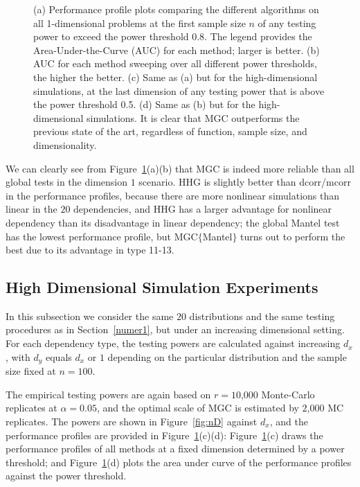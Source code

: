 \documentclass[11pt]{article}
\begin{document}
\begin{figure}[htbp]
{(a) Performance profile plots comparing the different algorithms on all 1-dimensional problems at the first sample size $n$ of any testing power to exceed the power threshold 0.8. The legend provides the Area-Under-the-Curve (AUC) for each method; larger is better.
(b) AUC for each method sweeping over all different power thresholds, the higher the better.
(c) Same as (a) but for the high-dimensional simulations, at the last dimension of any testing power that is above the power threshold 0.5.
(d) Same as (b) but for the high-dimensional simulations.
It is clear that MGC outperforms the previous state of the art, regardless of function, sample size, and dimensionality.}
\label{fig:pp}
\end{figure}

We can clearly see from Figure~\ref{fig:pp}(a)(b) that MGC is indeed more reliable than all global tests in the dimension $1$ scenario. HHG is slightly better than dcorr/mcorr in the performance profiles, because there are more nonlinear simulations than linear in the $20$ dependencies, and HHG has a larger advantage for nonlinear dependency than its disadvantage in linear dependency; the global Mantel test has the lowest performance profile, but MGC$\{$Mantel$\}$ turns out to perform the best due to its advantage in type 11-13. 



\subsection{High Dimensional Simulation Experiments}
\label{numer2}
In this subsection we consider the same $20$ distributions and the same testing procedures as in Section~\ref{numer1}, but under an increasing dimensional setting. For each dependency type, the testing powers are calculated against increasing $d_{x}$, with $d_{y}$ equals $d_{x}$ or $1$ depending on the particular distribution and the sample size fixed at $n=100$.

The empirical testing powers are again based on $r=10$,$000$ Monte-Carlo replicates at $\alpha=0.05$, and the optimal scale of MGC is estimated by $2$,$000$ MC replicates. The powers are shown in Figure~\ref{fig:nD} against $d_{x}$, and the performance profiles are provided in Figure~\ref{fig:pp}(c)(d): Figure~\ref{fig:pp}(c) draws the performance profiles of all methods at a fixed dimension determined by a power threshold; and Figure~\ref{fig:pp}(d) plots the area under curve of the performance profiles against the power threshold.
\end{document}
